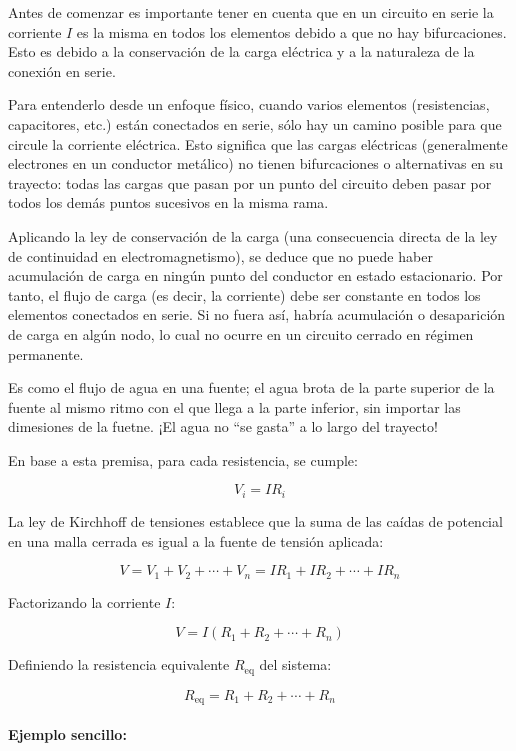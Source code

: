 Antes de comenzar es importante tener en cuenta que en un circuito en serie la corriente \( I \) es la misma en todos los elementos debido a que no hay bifurcaciones. Esto es debido a la conservación de la carga eléctrica y a la naturaleza de la conexión en serie.

Para entenderlo desde un enfoque físico, cuando varios elementos (resistencias, capacitores, etc.) están conectados en serie, sólo hay un camino posible para que circule la corriente eléctrica. Esto significa que las cargas eléctricas (generalmente electrones en un conductor metálico) no tienen bifurcaciones o alternativas en su trayecto: todas las cargas que pasan por un punto del circuito deben pasar por todos los demás puntos sucesivos en la misma rama.

Aplicando la ley de conservación de la carga (una consecuencia directa de la ley de continuidad en electromagnetismo), se deduce que no puede haber acumulación de carga en ningún punto del conductor en estado estacionario. Por tanto, el flujo de carga (es decir, la corriente) debe ser constante en todos los elementos conectados en serie. Si no fuera así, habría acumulación o desaparición de carga en algún nodo, lo cual no ocurre en un circuito cerrado en régimen permanente.

Es como el flujo de agua en una fuente; el agua brota de la parte superior de la fuente al mismo ritmo con el que llega a la parte inferior, sin importar las dimesiones de la fuetne. ¡El agua no ``se gasta'' a lo largo del trayecto!

En base a esta premisa, para cada resistencia, se cumple:

\[
V_i = I R_i
\]

La ley de Kirchhoff de tensiones establece que la suma de las caídas de potencial en una malla cerrada es igual a la fuente de tensión aplicada:

\[
V = V_1 + V_2 + \cdots + V_n = IR_1 + IR_2 + \cdots + IR_n
\]

Factorizando la corriente \( I \):

\[
V = I (R_1 + R_2 + \cdots + R_n)
\]

Definiendo la resistencia equivalente \( R_{\text{eq}} \) del sistema:

\[
\boxed{R_{\text{eq}} = R_1 + R_2 + \cdots + R_n}
\]

\paragraph{Ejemplo sencillo:}

